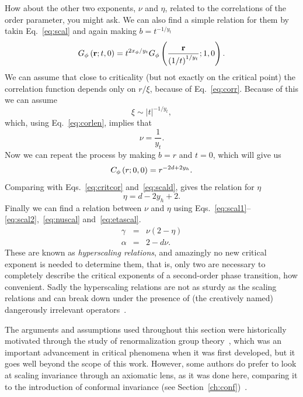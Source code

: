 How about the other two exponents, $\nu$ and $\eta$, related to the
correlations of the order parameter, you might ask. We can also find a simple
relation for them by takin Eq.~\ref{eq:scal} and again making $b=t^{-1/y_t}$
\begin{equation}
    G_{\phi}\left(\mathbf{r};t,0\right)=
    t^{2x_{\phi}/y_{t}}G_{\phi}
    \left(\frac{\mathbf{r}}{{\left(1/t\right)}^{1/y_{t}}};1,0\right).
\end{equation}
We can assume that close to criticality (but not exactly on the critical point)
the correlation function depends only on $r/\xi$, because of
Eq.~\ref{eq:corr}. Because of this we can assume
\begin{equation}
    \xi\sim\left|t\right|^{-1/y_t},
\end{equation}
which, using Eq.~\ref{eq:corlen}, implies that
\begin{equation}
    \label{eq:nuscal}
    \nu=\frac{1}{y_t}.
\end{equation}
Now we can repeat the process by making $b=r$ and $t=0$, which will give us
\begin{equation}
    C_{\phi}\left(r;0,0\right)=r^{-2d+2y_{h}}.
\end{equation}
Comparing with Eqs.~\ref{eq:critcor} and~\ref{eq:scald}, gives the relation for
$\eta$
\begin{equation}
    \label{eq:etascal}
    \eta=d-2y_h+2.
\end{equation}
Finally we can find a relation between $\nu$ and $\eta$ using
Eqs.~\ref{eq:scal1}--\ref{eq:scal2},~\ref{eq:nuscal} and~\ref{eq:etascal}.
\begin{eqnarray}
    \gamma & = & \nu\left(2-\eta\right)\\
    \alpha & = & 2-d\nu.
\end{eqnarray}
These are known as \textit{hyperscaling relations}, and amazingly no new
critical exponent is needed to determine them, that is, only two are necessary
to completely describe the critical exponents of a second-order phase
transition, how convenient. Sadly the hyperscaling relations are not as sturdy
as the scaling relations and can break down under the presence of (the
creatively named) dangerously irrelevant operators~\cite{Nishimori2011}.

The arguments and assumptions used throughout this section were historically
motivated through the study of renormalization group
theory~\cite{Pelissetto2002}, which was an important advancement in critical
phenomena when it was first developed, but it goes well beyond the scope of
this work. However, some authors do prefer to look at scaling invariance
through an axiomatic lens, as it was done here, comparing it to the
introduction of conformal invariance (see
Section~\ref{ch:conf})~\cite{Henkel2013}.


